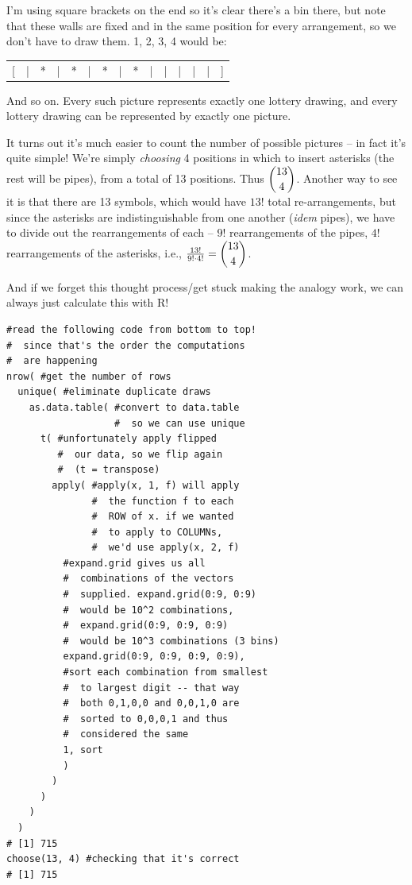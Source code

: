 \documentclass{article}
\newenvironment{solution}{\color{red}}{\color{black}}
\begin{document}
\begin{enumerate}
\begin{enumerate}
\begin{solution}
I'm using square brackets on the end so it's clear there's a bin there, but note that these walls are fixed and in the same position for every arrangement, so we don't have to draw them. 1, 2, 3, 4 would be:

\begin{center}
\begin{tabular}{ccccccccccccccc}
[ & | & * & | & * & | & * & | & * & | & | & | & | & | & ]
\end{tabular}
\end{center}

And so on. Every such picture represents exactly one lottery drawing, and every lottery drawing can be represented by exactly one picture. 

It turns out it's much easier to count the number of possible pictures -- in fact it's quite simple! We're simply \textit{choosing} 4 positions in which to insert asterisks (the rest will be pipes), from a total of 13 positions. Thus $\dbinom{13}4$. Another way to see it is that there are 13 symbols, which would have $13!$ total re-arrangements, but since the asterisks are indistinguishable from one another (\textit{idem} pipes), we have to divide out the rearrangements of each -- $9!$ rearrangements of the pipes, $4!$ rearrangements of the asterisks, i.e., $\frac{13!}{9!\cdot 4!} = \dbinom{13}4$.

And if we forget this thought process/get stuck making the analogy work, we can always just calculate this with R!

\begin{lstlisting}
#read the following code from bottom to top!
#  since that's the order the computations
#  are happening
nrow( #get the number of rows
  unique( #eliminate duplicate draws
    as.data.table( #convert to data.table
                   #  so we can use unique
      t( #unfortunately apply flipped
         #  our data, so we flip again
         #  (t = transpose)
        apply( #apply(x, 1, f) will apply
               #  the function f to each
               #  ROW of x. if we wanted
               #  to apply to COLUMNs,
               #  we'd use apply(x, 2, f)
          #expand.grid gives us all
          #  combinations of the vectors
          #  supplied. expand.grid(0:9, 0:9)
          #  would be 10^2 combinations,
          #  expand.grid(0:9, 0:9, 0:9)
          #  would be 10^3 combinations (3 bins)
          expand.grid(0:9, 0:9, 0:9, 0:9),
          #sort each combination from smallest
          #  to largest digit -- that way
          #  both 0,1,0,0 and 0,0,1,0 are
          #  sorted to 0,0,0,1 and thus
          #  considered the same
          1, sort
          )
        )
      )
    )
  )
# [1] 715
choose(13, 4) #checking that it's correct
# [1] 715
\end{lstlisting}
\end{solution}


\end{enumerate}
\end{enumerate}
\end{document}
